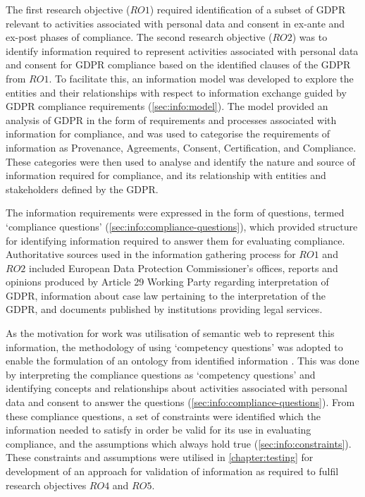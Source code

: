 The first research objective ($RO1$) required identification of a subset of GDPR relevant to activities associated with personal data and consent in ex-ante and ex-post phases of compliance. 
The second research objective ($RO2$) was to identify information required to represent activities associated with personal data and consent for GDPR compliance based on the identified clauses of the GDPR from $RO1$.
To facilitate this, an information model was developed to explore the entities and their relationships with respect to information exchange guided by GDPR compliance requirements (\autoref{sec:info:model}). The model provided an analysis of GDPR in the form of requirements and processes associated with information for compliance, and was used to categorise the requirements of information as Provenance, Agreements, Consent, Certification, and Compliance. These categories were then used to analyse and identify the nature and source of information required for compliance, and its relationship with entities and stakeholders defined by the GDPR.

The information requirements were expressed in the form of questions, termed `compliance questions' (\autoref{sec:info:compliance-questions}), which provided structure for identifying information required to answer them for evaluating compliance. 
Authoritative sources used in the information gathering process for $RO1$ and $RO2$ included European Data Protection Commissioner's offices, reports and opinions produced by Article 29 Working Party regarding interpretation of GDPR, information about case law pertaining to the interpretation of the GDPR, and documents published by institutions providing legal services.

As the motivation for work was utilisation of semantic web to represent this information, the methodology of using `competency questions' was adopted to enable the formulation of an ontology from identified information \cite{noy_ontology_2001}.
This was done by interpreting the compliance questions as `competency questions' and identifying concepts and relationships about activities associated with personal data and consent to answer the questions (\autoref{sec:info:compliance-questions}).
From these compliance questions, a set of constraints were identified which the information needed to satisfy in order be valid for its use in evaluating compliance, and the assumptions which always hold true (\autoref{sec:info:constraints}). These constraints and assumptions were utilised in \autoref{chapter:testing} for development of an approach for validation of information as required to fulfil research objectives $RO4$ and $RO5$.

